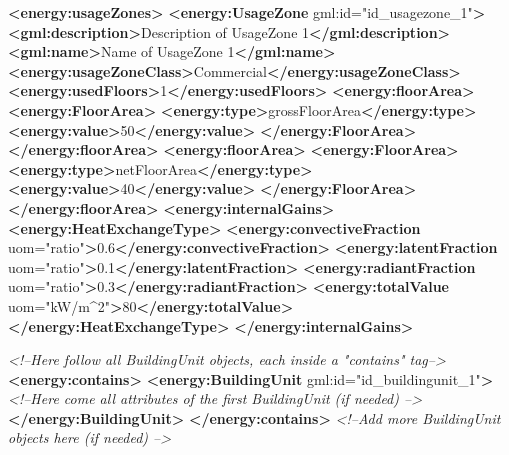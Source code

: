 \documentclass[a4paper,12pt]{article}
\newenvironment{Shaded}{}{}
\newcommand{\KeywordTok}[1]{\textcolor[rgb]{0.00,0.44,0.13}{\textbf{{#1}}}}
\newcommand{\StringTok}[1]{\textcolor[rgb]{0.25,0.44,0.63}{{#1}}}
\newcommand{\CommentTok}[1]{\textcolor[rgb]{0.38,0.63,0.69}{\textit{{#1}}}}
\newcommand{\OtherTok}[1]{\textcolor[rgb]{0.00,0.44,0.13}{{#1}}}
\newcommand{\NormalTok}[1]{{#1}}
\begin{document}
\begin{Shaded}
\begin{Highlighting}[]
            \KeywordTok{<energy:usageZones>}
                \KeywordTok{<energy:UsageZone}\OtherTok{ gml:id=}\StringTok{"id_usagezone_1"}\KeywordTok{>}
                    \KeywordTok{<gml:description>}\NormalTok{Description of UsageZone 1}\KeywordTok{</gml:description>}
                    \KeywordTok{<gml:name>}\NormalTok{Name of UsageZone 1}\KeywordTok{</gml:name>}
                    \KeywordTok{<energy:usageZoneClass>}\NormalTok{Commercial}\KeywordTok{</energy:usageZoneClass>}
                    \KeywordTok{<energy:usedFloors>}\NormalTok{1}\KeywordTok{</energy:usedFloors>}
                    \KeywordTok{<energy:floorArea>}
                        \KeywordTok{<energy:FloorArea>}
                            \KeywordTok{<energy:type>}\NormalTok{grossFloorArea}\KeywordTok{</energy:type>}
                            \KeywordTok{<energy:value>}\NormalTok{50}\KeywordTok{</energy:value>}
                        \KeywordTok{</energy:FloorArea>}
                    \KeywordTok{</energy:floorArea>}
                    \KeywordTok{<energy:floorArea>}
                        \KeywordTok{<energy:FloorArea>}
                            \KeywordTok{<energy:type>}\NormalTok{netFloorArea}\KeywordTok{</energy:type>}
                            \KeywordTok{<energy:value>}\NormalTok{40}\KeywordTok{</energy:value>}
                        \KeywordTok{</energy:FloorArea>}
                    \KeywordTok{</energy:floorArea>}
                    \KeywordTok{<energy:internalGains>}
                        \KeywordTok{<energy:HeatExchangeType>}
                            \KeywordTok{<energy:convectiveFraction}\OtherTok{ uom=}\StringTok{"ratio"}\KeywordTok{>}\NormalTok{0.6}\KeywordTok{</energy:convectiveFraction>}
                            \KeywordTok{<energy:latentFraction}\OtherTok{ uom=}\StringTok{"ratio"}\KeywordTok{>}\NormalTok{0.1}\KeywordTok{</energy:latentFraction>}
                            \KeywordTok{<energy:radiantFraction}\OtherTok{ uom=}\StringTok{"ratio"}\KeywordTok{>}\NormalTok{0.3}\KeywordTok{</energy:radiantFraction>}
                            \KeywordTok{<energy:totalValue}\OtherTok{ uom=}\StringTok{"kW/m^2"}\KeywordTok{>}\NormalTok{80}\KeywordTok{</energy:totalValue>}
                        \KeywordTok{</energy:HeatExchangeType>}
                    \KeywordTok{</energy:internalGains>}

                    \CommentTok{<!--Here follow all BuildingUnit objects, each inside a "contains" tag-->}
                    \KeywordTok{<energy:contains>}
                        \KeywordTok{<energy:BuildingUnit}\OtherTok{ gml:id=}\StringTok{"id_buildingunit_1"}\KeywordTok{>}
                            \CommentTok{<!--Here come all attributes of the first BuildingUnit (if needed) -->}
                        \KeywordTok{</energy:BuildingUnit>}
                    \KeywordTok{</energy:contains>}
                    \CommentTok{<!--Add more BuildingUnit objects here (if needed) -->}


\end{Highlighting}
\end{Shaded}
\end{document}
